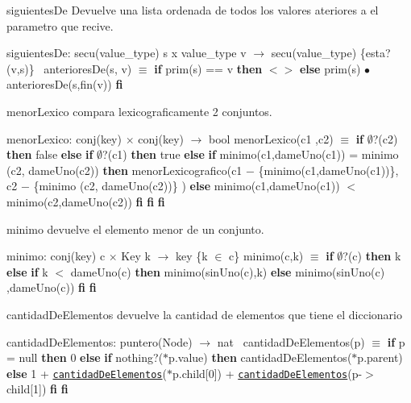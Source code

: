 \begin{DoxyParagraph}{siguientes\+De}
Devuelve una lista ordenada de todos los valores ateriores a el parametro que recive.

siguientes\+De\+: secu(value\+\_\+type) s x value\+\_\+type v $\to$ secu(value\+\_\+type) \{esta?(v,s)\}~\newline
 anteriores\+De(s, v) $\equiv$ {\bfseries if} prim(s) == v {\bfseries then} $<$$>$ {\bfseries else} prim(s) $\bullet$ anteriores\+De(s,fin(v)) {\bfseries fi} 
\end{DoxyParagraph}


\begin{DoxyParagraph}{menor\+Lexico}
compara lexicograficamente 2 conjuntos.

menor\+Lexico\+: conj(key) $\times$ conj(key) $\to$ bool menor\+Lexico(c1 ,c2) $\equiv$ {\bfseries if} $\emptyset$?(c2) {\bfseries then} false {\bfseries else} {\bfseries if} $\emptyset$?(c1) {\bfseries then} true {\bfseries else} {\bfseries if} minimo(c1,dame\+Uno(c1)) = minimo (c2, dame\+Uno(c2)) {\bfseries then} menor\+Lexicografico(c1 $-$ \{minimo(c1,dame\+Uno(c1))\}, c2 $-$ \{minimo (c2, dame\+Uno(c2))\} ) {\bfseries else} minimo(c1,dame\+Uno(c1)) $<$ minimo(c2,dame\+Uno(c2)) {\bfseries fi} {\bfseries fi} {\bfseries fi} 
\end{DoxyParagraph}


\begin{DoxyParagraph}{minimo}
devuelve el elemento menor de un conjunto.

minimo\+: conj(key) c $\times$ Key k $\to$ key \{k $\in$ c\} minimo(c,k) $\equiv$ {\bfseries if} $\emptyset$?(c) {\bfseries then} k {\bfseries else} {\bfseries if} k $<$ dame\+Uno(c) {\bfseries then} minimo(sin\+Uno(c),k) {\bfseries else} minimo(sin\+Uno(c) ,dame\+Uno(c)) {\bfseries fi} {\bfseries fi} 
\end{DoxyParagraph}


\begin{DoxyParagraph}{cantidad\+De\+Elementos}
devuelve la cantidad de elementos que tiene el diccionario

cantidad\+De\+Elementos\+: puntero(\+Node) $\to$ nat~\newline
 cantidad\+De\+Elementos(p) $\equiv$ {\bfseries if} p = null {\bfseries then} 0 {\bfseries else} {\bfseries if} nothing?($\ast$p.value) {\bfseries then} cantidad\+De\+Elementos($\ast$p.parent) ~\newline
 {\bfseries else} 1 + \href{axiomas.html#cantidadDeElementos}{\tt cantidad\+De\+Elementos}($\ast$p.child\mbox{[}0\mbox{]}) + \href{axiomas.html#cantidadDeElementos}{\tt cantidad\+De\+Elementos}(p-\/$>$child\mbox{[}1\mbox{]}) {\bfseries fi} {\bfseries fi} 
\end{DoxyParagraph}


